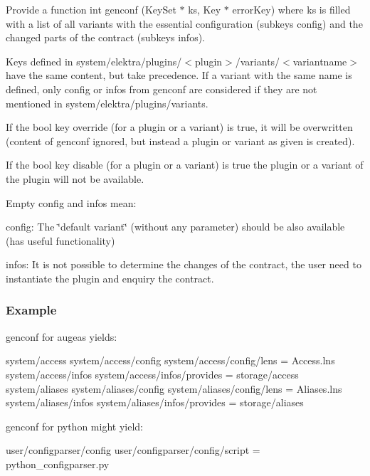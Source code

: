 \begin{DoxyEnumerate}
\item Provide a function {\ttfamily int genconf (Key\+Set $\ast$ ks, Key $\ast$ error\+Key)} where {\ttfamily ks} is filled with a list of all variants with the essential configuration (subkeys {\ttfamily config}) and the changed parts of the contract (subkeys {\ttfamily infos}).
\item Keys defined in {\ttfamily system/elektra/plugins/$<$plugin$>$/variants/$<$variantname$>$} have the same content, but take precedence. If a variant with the same name is defined, only {\ttfamily config} or {\ttfamily infos} from {\ttfamily genconf} are considered if they are not mentioned in {\ttfamily system/elektra/plugins/variants}.
\item If the bool key {\ttfamily override} (for a plugin or a variant) is true, it will be overwritten (content of {\ttfamily genconf} ignored, but instead a plugin or variant as given is created).
\item If the bool key {\ttfamily disable} (for a plugin or a variant) is true the plugin or a variant of the plugin will not be available.
\item Empty {\ttfamily config} and {\ttfamily infos} mean\+:
\begin{DoxyItemize}
\item {\ttfamily config}\+: The \char`\"{}default variant\char`\"{} (without any parameter) should be also available (has useful functionality)
\item {\ttfamily infos}\+: It is not possible to determine the changes of the contract, the user need to instantiate the plugin and enquiry the contract.
\end{DoxyItemize}
\end{DoxyEnumerate}

\subsubsection*{Example}

{\ttfamily genconf} for augeas yields\+: 
\begin{DoxyCode}
system/access
system/access/config
system/access/config/lens = Access.lns
system/access/infos
system/access/infos/provides = storage/access
system/aliases
system/aliases/config
system/aliases/config/lens = Aliases.lns
system/aliases/infos
system/aliases/infos/provides = storage/aliases
\end{DoxyCode}


{\ttfamily genconf} for python might yield\+: 
\begin{DoxyCode}
user/configparser/config
user/configparser/config/script = python\_configparser.py
\end{DoxyCode}


